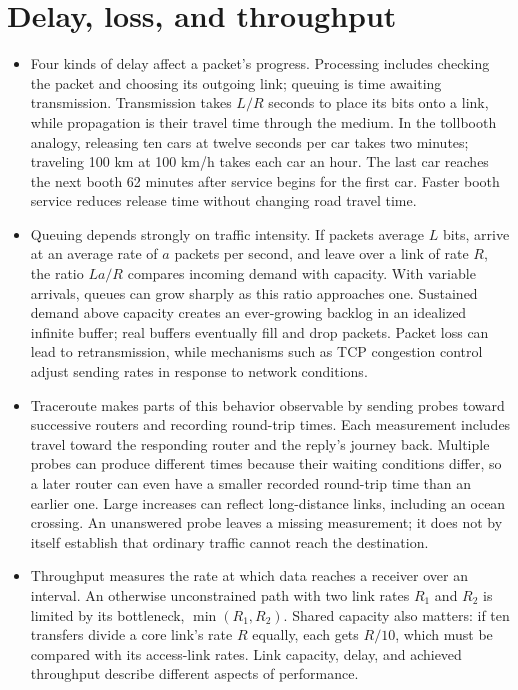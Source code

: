 \documentclass[10pt]{article}
\begin{document}
\section*{Delay, loss, and throughput}

\begin{itemize}[leftmargin=1.25em, itemsep=0.3em, parsep=0pt, topsep=0pt]
    \item Four kinds of delay affect a packet's progress. Processing includes checking the packet and choosing its outgoing link; queuing is time awaiting transmission. Transmission takes \(L/R\) seconds to place its bits onto a link, while propagation is their travel time through the medium. In the tollbooth analogy, releasing ten cars at twelve seconds per car takes two minutes; traveling 100 km at 100 km/h takes each car an hour. The last car reaches the next booth 62 minutes after service begins for the first car. Faster booth service reduces release time without changing road travel time.

    \item Queuing depends strongly on traffic intensity. If packets average \(L\) bits, arrive at an average rate of \(a\) packets per second, and leave over a link of rate \(R\), the ratio \(La/R\) compares incoming demand with capacity. With variable arrivals, queues can grow sharply as this ratio approaches one. Sustained demand above capacity creates an ever-growing backlog in an idealized infinite buffer; real buffers eventually fill and drop packets. Packet loss can lead to retransmission, while mechanisms such as TCP congestion control adjust sending rates in response to network conditions.

    \item Traceroute makes parts of this behavior observable by sending probes toward successive routers and recording round-trip times. Each measurement includes travel toward the responding router and the reply's journey back. Multiple probes can produce different times because their waiting conditions differ, so a later router can even have a smaller recorded round-trip time than an earlier one. Large increases can reflect long-distance links, including an ocean crossing. An unanswered probe leaves a missing measurement; it does not by itself establish that ordinary traffic cannot reach the destination.

    \item Throughput measures the rate at which data reaches a receiver over an interval. An otherwise unconstrained path with two link rates \(R_1\) and \(R_2\) is limited by its bottleneck, \(\min(R_1,R_2)\). Shared capacity also matters: if ten transfers divide a core link's rate \(R\) equally, each gets \(R/10\), which must be compared with its access-link rates. Link capacity, delay, and achieved throughput describe different aspects of performance.
\end{itemize}
\end{document}
